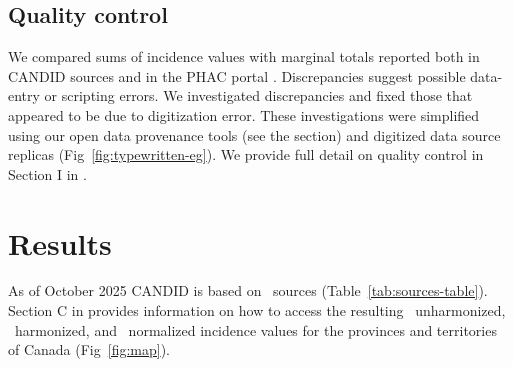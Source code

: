 \documentclass[10pt,letterpaper]{article}
\begin{document}
\subsection*{Quality control}\label{sec:quality-control}

We compared sums of incidence values with marginal totals reported both in CANDID sources and in the PHAC portal \cite{totten2019updates}. Discrepancies suggest possible data-entry or scripting errors. We investigated discrepancies and fixed those that appeared to be due to digitization error. These investigations were simplified using our open data provenance tools (see the  section) and digitized data source replicas (Fig~\ref{fig:typewritten-eg}). We provide full detail on quality control in Section I in .

\section*{Results}\label{sec:results}

As of October 2025 CANDID is based on \ sources (Table~\ref{tab:sources-table}). Section C in  provides information on how to access the resulting \ unharmonized, \ harmonized, and \ normalized incidence values for the provinces and territories of Canada (Fig~\ref{fig:map}).
\end{document}
